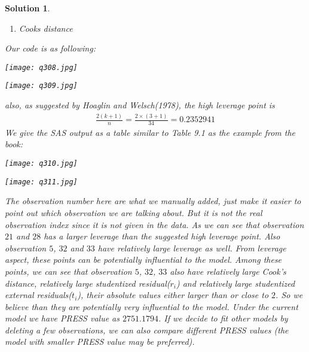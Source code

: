 \documentclass[11pt]{article}
\newtheorem{sol}{Solution}
\begin{document}
\begin{sol}
\begin{enumerate}
		\item Cooks distance
	\end{enumerate}
	Our code is as following:
	\begin{center}
		\texttt{[image: q308.jpg]}
	\end{center}
	\begin{center}
		\texttt{[image: q309.jpg]}
	\end{center}
	also, as suggested by Hoaglin and Welsch(1978), the high leverage point is 
	\begin{align*}
		\frac{2(k + 1)}{n} = \frac{2\times (3 + 1)}{34} = 0.2352941
	\end{align*}
	We give the SAS output as a table similar to Table 9.1 as the example from the book:
	\begin{center}
		\texttt{[image: q310.jpg]}
	\end{center}
	\begin{center}
		\texttt{[image: q311.jpg]}
	\end{center}
	The observation number here are what we manually added, just make it easier to point out which observation we are talking about. But it is not the real observation index since it is not given in the data.\vskip 2mm
	As we can see that observation $21$ and $28$ has a larger leverage than the suggested high leverage point. Also observation $5$, $32$ and $33$ have relatively large leverage as well. From leverage aspect, these points can be potentially influential to the model.\vskip 2mm
    Among these points, we can see that observation $5$, $32$, $33$ also have relatively large Cook's distance, relatively large studentized residual($r_i$) and relatively large studentized external residuals($t_i$), their absolute values either larger than or close to $2$.  So we believe than they are potentially very influential to the model.\vskip 2mm
    Under the current model we have PRESS value as $2751.1794$. If we decide to fit other models by deleting a few observations, we can also compare different PRESS values (the model with smaller PRESS value may be preferred).
\end{sol}
\end{document}
